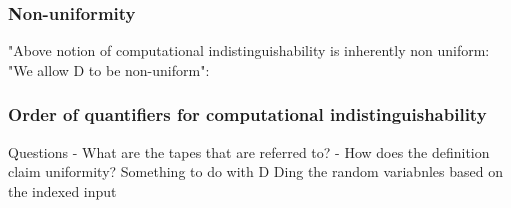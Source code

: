 \subsubsection*{Non-uniformity}
"Above notion of computational indistinguishability is inherently non uniform: 
"We allow D to be non-uniform": 

\subsubsection*{Order of quantifiers for computational indistinguishability}


Questions
- What are the tapes that are referred to?
- How does the definition claim uniformity? Something to do with D Ding the random variabnles based on the indexed input
